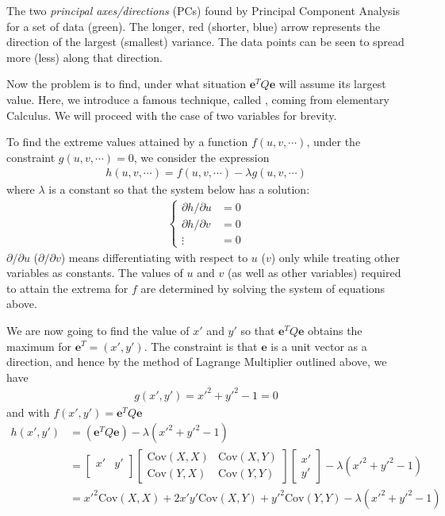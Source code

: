 The two \textit{principal axes/directions} (PCs) found by Principal Component Analysis for a set of data (green). The longer, red (shorter, blue) arrow represents the direction of the largest (smallest) variance. The data points can be seen to spread more (less) along that direction. \par
Now the problem is to find, under what situation $\textbf{e}^T Q \textbf{e}$ will assume its largest value. Here, we introduce a famous technique, called , coming from elementary Calculus. We will proceed with the case of two variables for brevity.
\begin{thm}
\label{thm:LagrangeMul}
To find the extreme values attained by a function $f(u,v,\cdots)$, under the constraint $g(u,v,\cdots) = 0$, we consider the expression
\begin{align*}
h(u,v,\cdots) = f(u,v,\cdots) - \lambda g(u,v,\cdots)
\end{align*}
where $\lambda$ is a constant so that the system below has a solution:
\begin{align*}
\begin{cases}
\partial h/\partial u &= 0 \\
\partial h/\partial v &= 0 \\
\vdots &= 0
\end{cases}
\end{align*}
$\partial/\partial u$ ($\partial/\partial v$) means differentiating with respect to $u$ ($v$) only while treating other variables as constants. The values of $u$ and $v$ (as well as other variables) required to attain the extrema for $f$ are determined by solving the system of equations above. 
\end{thm}
We are now going to find the value of $x'$ and $y'$ so that $\textbf{e}^T Q \textbf{e}$ obtains the maximum for $\textbf{e}^T = (x',y')$. The constraint is that $\textbf{e}$ is a unit vector as a direction, and hence by the method of Lagrange Multiplier outlined above, we have
\begin{align*}
g(x',y') = x'^2 + y'^2 - 1 = 0
\end{align*}
and with $f(x',y') = \textbf{e}^T Q \textbf{e}$
\begin{align*}
h(x',y') &= (\textbf{e}^T Q \textbf{e}) - \lambda(x'^2 + y'^2 - 1) \\
&= \begin{bmatrix}
x' & y' \\
\end{bmatrix}
\begin{bmatrix}
\text{Cov}(X, X) & \text{Cov}(X, Y) \\
\text{Cov}(Y, X) & \text{Cov}(Y, Y) 
\end{bmatrix}
\begin{bmatrix}
x' \\
y'
\end{bmatrix}
- \lambda(x'^2 + y'^2 - 1) \\
&= x'^2 \text{Cov}(X, X) + 2x'y' \text{Cov}(X, Y) + y'^2\text{Cov}(Y, Y) - \lambda(x'^2 + y'^2 - 1)
\end{align*}

